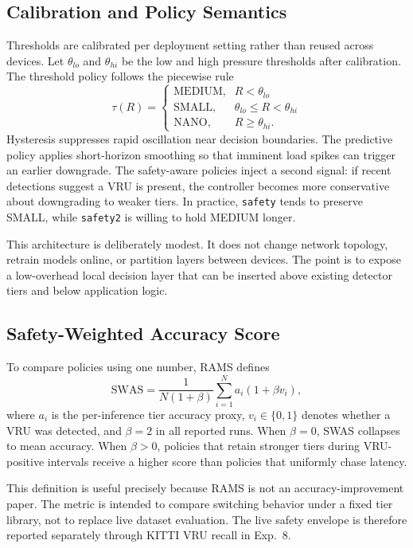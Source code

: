 \documentclass[10pt,journal]{IEEEtran}
\newcommand{\rams}{RAMS}
\newcommand{\swas}{SWAS}
\begin{document}
\subsection{Calibration and Policy Semantics}
Thresholds are calibrated per deployment setting rather than reused across devices. Let $\theta_{lo}$ and $\theta_{hi}$ be the low and high pressure thresholds after calibration. The threshold policy follows the piecewise rule
\begin{equation}
\tau(R)=
\begin{cases}
\text{MEDIUM}, & R < \theta_{lo}\\
\text{SMALL}, & \theta_{lo} \le R < \theta_{hi}\\
\text{NANO}, & R \ge \theta_{hi}.
\end{cases}
\end{equation}
Hysteresis suppresses rapid oscillation near decision boundaries. The predictive policy applies short-horizon smoothing so that imminent load spikes can trigger an earlier downgrade. The safety-aware policies inject a second signal: if recent detections suggest a VRU is present, the controller becomes more conservative about downgrading to weaker tiers. In practice, \texttt{safety} tends to preserve SMALL, while \texttt{safety2} is willing to hold MEDIUM longer.

This architecture is deliberately modest. It does not change network topology, retrain models online, or partition layers between devices. The point is to expose a low-overhead local decision layer that can be inserted above existing detector tiers and below application logic.

\subsection{Safety-Weighted Accuracy Score}
To compare policies using one number, \rams{} defines
\begin{equation}
\mathrm{SWAS}=\frac{1}{N(1+\beta)}\sum_{i=1}^{N} a_i \left(1+\beta v_i\right),
\end{equation}
where $a_i$ is the per-inference tier accuracy proxy, $v_i\in\{0,1\}$ denotes whether a VRU was detected, and $\beta=2$ in all reported runs. When $\beta=0$, \swas{} collapses to mean accuracy. When $\beta>0$, policies that retain stronger tiers during VRU-positive intervals receive a higher score than policies that uniformly chase latency.

This definition is useful precisely because \rams{} is not an accuracy-improvement paper. The metric is intended to compare switching behavior under a fixed tier library, not to replace live dataset evaluation. The live safety envelope is therefore reported separately through KITTI VRU recall in Exp.~8.
\end{document}
